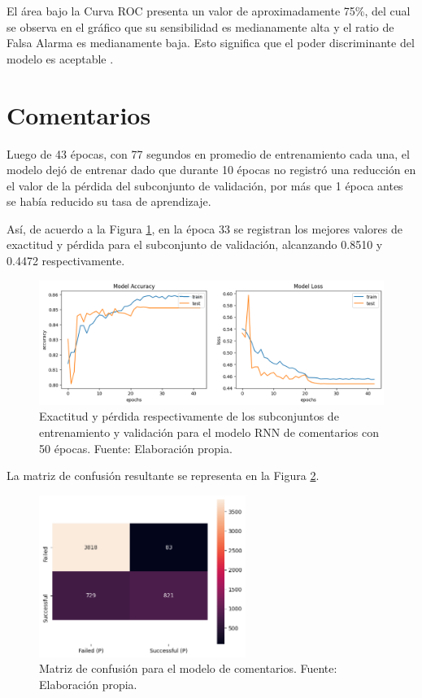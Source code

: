 El área bajo la Curva ROC presenta un valor de aproximadamente 75\%, del cual se observa en el gráfico que su sensibilidad es medianamente alta y el ratio de Falsa Alarma es medianamente baja. Esto significa que el poder discriminante del modelo es aceptable \parencite{bk_britos2006datamining}.

\section{Comentarios}
Luego de 43 épocas, con 77 segundos en promedio de entrenamiento cada una, el modelo dejó de entrenar dado que durante 10 épocas no registró una reducción en el valor de la pérdida del subconjunto de validación, por más que 1 época antes se había reducido su tasa de aprendizaje.

Así, de acuerdo a la Figura \ref{5:fig7}, en la época 33 se registran los mejores valores de exactitud y pérdida para el subconjunto de validación, alcanzando 0.8510 y 0.4472 respectivamente.

\begin{figure}[!ht]
	\begin{center}
		\includegraphics[width=1\textwidth]{5/figures/comments_model_acc_loss.png}
		\caption{Exactitud y pérdida respectivamente de los subconjuntos de entrenamiento y validación para el modelo RNN de comentarios con 50 épocas. Fuente: Elaboración propia.}
		\label{5:fig7}
	\end{center}
\end{figure}

La matriz de confusión resultante se representa en la Figura \ref{5:fig8}.
\begin{figure}[!ht]
	\begin{center}
		\includegraphics[width=0.60\textwidth]{5/figures/comments_confusion_matrix.png}
		\caption{Matriz de confusión para el modelo de comentarios. Fuente: Elaboración propia.}
		\label{5:fig8}
	\end{center}
\end{figure}

